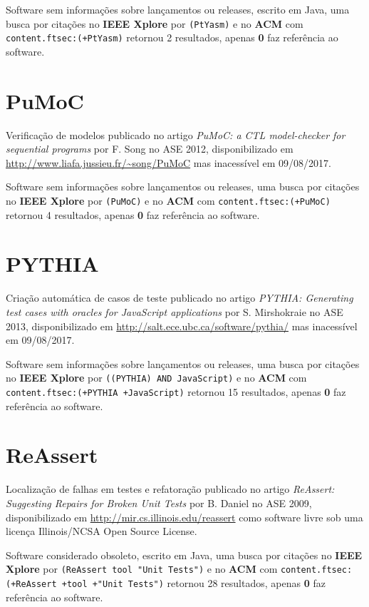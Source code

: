 Software sem informações sobre lançamentos ou releases,
escrito em Java,
uma busca por citações no {\bf IEEE Xplore} por
\texttt{(PtYasm)}
e no {\bf ACM} com
\texttt{content.ftsec:(+PtYasm)}
retornou
2 resultados, apenas
{\bf 0} faz referência ao software.



\section{PuMoC}

Verificação de modelos
publicado no artigo {\it PuMoC: a CTL model-checker for sequential programs}
por F. Song
no ASE 2012,
disponibilizado em \url{http://www.liafa.jussieu.fr/~song/PuMoC}
mas inacessível em 09/08/2017.

Software sem informações sobre lançamentos ou releases,
uma busca por citações no {\bf IEEE Xplore} por
\texttt{(PuMoC)}
e no {\bf ACM} com
\texttt{content.ftsec:(+PuMoC)}
retornou
4 resultados, apenas
{\bf 0} faz referência ao software.



\section{PYTHIA}

Criação automática de casos de teste
publicado no artigo {\it PYTHIA: Generating test cases with oracles for JavaScript applications}
por S. Mirshokraie
no ASE 2013,
disponibilizado em \url{http://salt.ece.ubc.ca/software/pythia/}
mas inacessível em 09/08/2017.

Software sem informações sobre lançamentos ou releases,
uma busca por citações no {\bf IEEE Xplore} por
\texttt{((PYTHIA) AND JavaScript)}
e no {\bf ACM} com
\texttt{content.ftsec:(+PYTHIA +JavaScript)}
retornou
15 resultados, apenas
{\bf 0} faz referência ao software.



\section{ReAssert}

Localização de falhas em testes e refatoração
publicado no artigo {\it ReAssert: Suggesting Repairs for Broken Unit Tests}
por B. Daniel
no ASE 2009,
disponibilizado em \url{http://mir.cs.illinois.edu/reassert}
como software livre
sob uma licença Illinois/NCSA Open Source License.

Software considerado obsoleto,
escrito em Java,
uma busca por citações no {\bf IEEE Xplore} por
\texttt{(ReAssert tool "Unit Tests")}
e no {\bf ACM} com
\texttt{content.ftsec:(+ReAssert +tool +"Unit Tests")}
retornou
28 resultados, apenas
{\bf 0} faz referência ao software.



